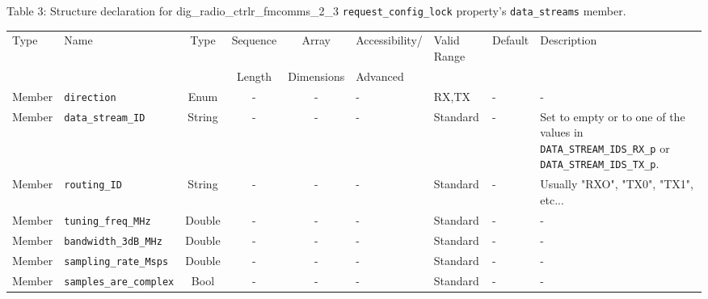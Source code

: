 \documentclass{article}
\def\comp{dig\_radio\_ctrlr\_fmcomms\_2\_3}
\begin{document}
\begin{landscape}
	\noindent Table \hypertarget{tab3}{3}: Structure declaration for \comp{} \verb+request_config_lock+ property's \verb+data_streams+ member. \\
	\begin{scriptsize}
		\noindent\begin{longtable}{|p{1.8cm}|p{3.6cm}|c|c|c|p{2cm}|p{1.7cm}|p{1.0cm}|p{7.37cm}|}
			\hline
			\rowcolor{blue}
			Type         & Name                                & Type & Sequence & Array      & Accessibility/ & Valid Range  & Default & Description                                                                                                                                                                                                                 \\
			\rowcolor{blue}
			             &                                     &      & Length   & Dimensions & Advanced       &              &         &                                                                                                                                                                                                                             \\
			\hline
			Member       & \verb+direction+                    & Enum  & -       & -          & -              & RX,TX        & -       & - \\
			\hline
			Member       & \verb+data_stream_ID+               & String& -       & -          & -              & Standard     & -       & Set to empty or to one of the values in \verb+DATA_STREAM_IDS_RX_p+ or \verb+DATA_STREAM_IDS_TX_p+. \\
			\hline
			Member       & \verb+routing_ID+                   & String& -       & -          & -              & Standard     & -       & Usually "RXO", "TX0", "TX1", etc... \\
			\hline
			Member       & \verb+tuning_freq_MHz+              & Double & -       & -          & -              & Standard     & -       & - \\
			\hline
			Member       & \verb+bandwidth_3dB_MHz+              & Double & -       & -          & -              & Standard     & -       & - \\
			\hline
			Member       & \verb+sampling_rate_Msps+             & Double & -       & -          & -              & Standard     & -       & - \\
			\hline
			Member       & \verb+samples_are_complex+            & Bool   & -       & -          & -              & Standard     & -       & - \\

\end{longtable}
\end{scriptsize}
\end{landscape}
\end{document}
